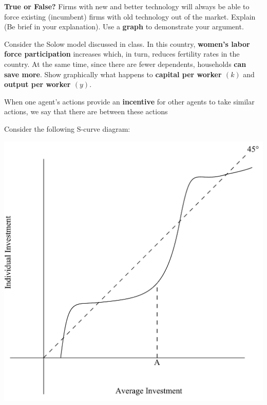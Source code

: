 \documentclass[12pt]{exam}
\begin{document}
\begin{questions}
    
\question[10] 
\textbf{True or False?}
Firms with new and better technology will always be able to force existing (incumbent) firms with old technology out of the market. 
Explain (Be brief in your explanation).
Use a \textbf{graph} to demonstrate your argument.

\question[5]
Consider the Solow model discussed in class.
In this country, \textbf{women's labor force participation} increases which, in turn, reduces fertility rates in the country. 
At the same time, since there are fewer dependents, households \textbf{can save more}. 
Show graphically what happens to \textbf{capital per worker $(k)$} and \textbf{output per worker $(y)$}.

\newpage 

\question[2]
When one agent's actions provide an \textbf{incentive} for other agents to take similar actions, we say that there are \fillin[complementarities][4cm] between these actions

\question
Consider the following S-curve diagram:
\begin{center}
\includegraphics[scale=0.3]{images/scurve.pdf}
\end{center}


\end{questions}
\end{document}
